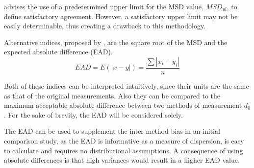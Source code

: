 \documentclass[12pt, a4paper]{report}
\theoremstyle{plain}
\theoremstyle{definition}
\theoremstyle{remark}
\begin{document}
	
	\citet{Barnhart} advises the use of a predetermined upper limit
	for the MSD value, $MSD_{ul}$, to define satisfactory agreement.
	However, a satisfactory upper limit may not be easily
	determinable, thus creating a drawback to this methodology.
	
	
	Alternative indices, proposed by \citet{Barnhart}, are the square root of the MSD and the expected absolute difference (EAD). 
	\[
	EAD = E(|x - y|) = \frac{\sum |x_{i}- y_{i}|}{n}
	\]
	
	
	Both of these indices can be interpreted intuitively, since their units are the same as that of the original measurements. Also they can be compared to the maximum acceptable absolute difference between two methods of measurement $d_{0}$. For the sake of brevity, the EAD will be considered solely.
	
	The EAD can be used to supplement the inter-method bias in an
	initial comparison study, as the EAD is informative as a measure
	of dispersion, is easy to calculate and requires no distributional
	assumptions. A consequence of using absolute differences is that high variances would result in a higher EAD value. 
	
	
\end{document}
